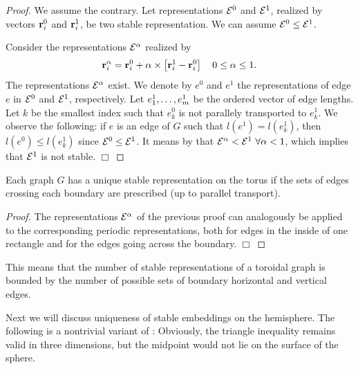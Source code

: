 \documentclass[invmat]{svjour}
\begin{document}
\begin{proof}
We assume the contrary.  Let representations $\mathcal{E}^0$ and $\mathcal{E}^1$,
realized by vectors $\mathbf{r}_i^0$ and $\mathbf{r}_i^1$, be two stable
representation.  We can assume $\mathcal{E}^0 \le \mathcal{E}^1 $.

Consider the representations $\mathcal{E}^{\alpha}$ realized by
\begin{equation*}
\mathbf{r}_i^{\alpha} = \mathbf{r}_i^0 + \alpha \times
\left[ \mathbf{r}_i^1-\mathbf{r}_i^0 \right]\quad 0 \le \alpha \le 1 .
\label{e:alpha_relation}
\end{equation*}
The representations $\mathcal{E}^{\alpha}$ exist. We denote by $e^0$ and $e^1$ the
representations of edge $e$ in $\mathcal{E}^0$ and $\mathcal{E}^1$, respectively.
Let $e^1_1 ,\ldots, e^1_m$  be the ordered vector of edge lengths.  Let $k$
be the smallest index such that $e^0_k$  is not parallely transported
to $e^1_k$.  We observe the following: if $e$ is an edge of $G$ such
that $l(e^1) = l(e^1_k)$, then $l(e^0) \le l(e^1_k)$ since $\mathcal{E}^0 \le
\mathcal{E}^1 $.  It means by  that
$\mathcal{E}^{\alpha}< \mathcal{E}^1\ \forall \alpha <1$, which implies that
$\mathcal{E}^1 $ is not stable. $\Box$
\end{proof}

\begin{proposition}
\label{p:unique_torus}
Each graph $G$ has
a unique stable representation on the torus if the sets of
edges crossing each boundary are prescribed (up to parallel transport).
\end{proposition}
\begin{proof} The representations $\mathcal{E}^{\alpha}$ of the
previous proof can analogously be applied to the corresponding periodic
representations, both for edges in the inside of one rectangle and for the
edges going across the boundary.
$\Box$
\end{proof}
This means that the number of stable representations of a toroidal graph
is bounded by the number of possible sets of boundary horizontal and
vertical edges.

Next we will discuss uniqueness of stable embeddings on the hemisphere.
The following  is a nontrivial variant
of : Obviously, the triangle inequality remains
valid in three dimensions, but the midpoint would not lie on the surface
of the sphere.
\end{document}
